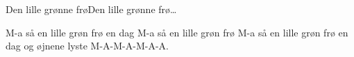 \begin{sang}{Den lille grønne frø}{Den lille grønne frø\ldots}
\begin{vers}
M-a så en lille grøn frø en dag
M-a så en lille grøn frø
M-a så en lille grøn frø en dag 
og øjnene lyste M-A-M-A-M-A-A.
\end{vers}

\end{sang}